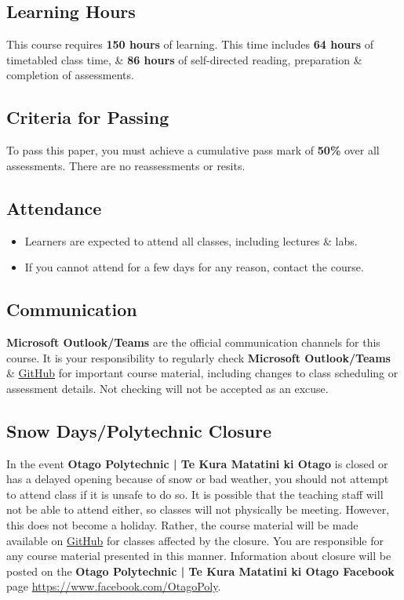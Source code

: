 \documentclass{article}
\begin{document}
\subsection*{Learning Hours}
This course requires \textbf{150 hours} of learning. This time includes \textbf{64 hours} of timetabled class time, \& \textbf{86 hours} of self-directed reading, preparation \& completion of assessments.

\subsection*{Criteria for Passing}
To pass this paper, you must achieve a cumulative pass mark of \textbf{50\%} over all assessments. There are no reassessments or resits. 

\subsection*{Attendance}
\begin{itemize}
	\item Learners are expected to attend all classes, including lectures \& labs.
	\item If you cannot attend for a few days for any reason, contact the course.
\end{itemize} 

\subsection*{Communication}
\textbf{Microsoft Outlook/Teams} are the official communication channels for this course. It is your responsibility to regularly check \textbf{Microsoft Outlook/Teams} \& \href{https://github.com/otago-polytechnic-bit-courses/ID721001-mobile-application-development}{GitHub} for important course material, including changes to class scheduling or assessment details. Not checking will not be accepted as an excuse.

\subsection*{Snow Days/Polytechnic Closure}
In the event \textbf{Otago Polytechnic | Te Kura Matatini ki Otago} is closed or has a delayed opening because of snow or bad weather, you should not attempt to attend class if it is unsafe to do so. It is possible that the teaching staff will not be able to attend either, so classes will not physically be meeting. However, this does not become a holiday. Rather, the course material will be made available on \href{https://github.com/otago-polytechnic-bit-courses/ID721001-mobile-application-development}{GitHub} for classes affected by the closure. You are responsible for any course material presented in this manner. Information about closure will be posted on the \textbf{Otago Polytechnic | Te Kura Matatini ki Otago Facebook} page \href{https://www.facebook.com/OtagoPoly}{https://www.facebook.com/OtagoPoly}.
\end{document}
